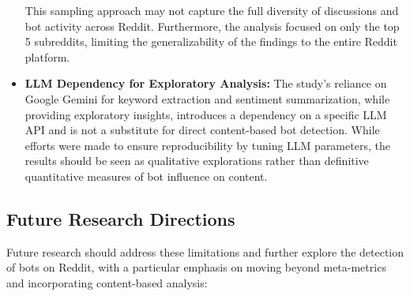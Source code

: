 \documentclass[
  12pt,
  letterpaper,
  DIV=11,
  numbers=noendperiod]{scrartcl}
\begin{document}
\begin{itemize}
  This sampling approach may not capture the full diversity of
  discussions and bot activity across Reddit. Furthermore, the analysis
  focused on only the top 5 subreddits, limiting the generalizability of
  the findings to the entire Reddit platform.
\item
  \textbf{LLM Dependency for Exploratory Analysis:} The study's reliance
  on Google Gemini for keyword extraction and sentiment summarization,
  while providing exploratory insights, introduces a dependency on a
  specific LLM API and is not a substitute for direct content-based bot
  detection. While efforts were made to ensure reproducibility by tuning
  LLM parameters, the results should be seen as qualitative explorations
  rather than definitive quantitative measures of bot influence on
  content.
\end{itemize}

\subsection{Future Research
Directions}\label{future-research-directions}

Future research should address these limitations and further explore the
detection of bots on Reddit, with a particular emphasis on moving beyond
meta-metrics and incorporating content-based analysis:
\end{document}
